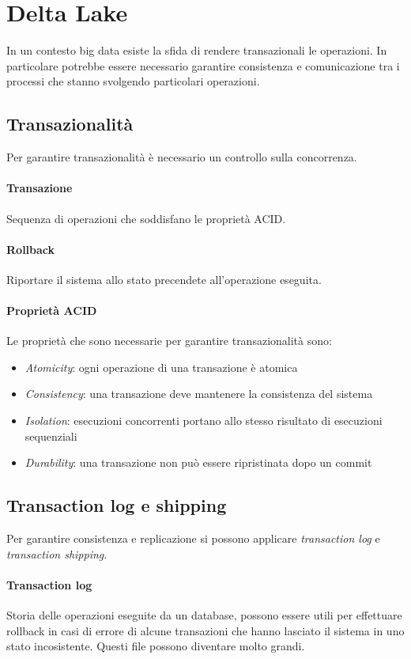 \section{Delta Lake}
In un contesto big data esiste la sfida di rendere transazionali le operazioni.
In particolare potrebbe essere necessario garantire consistenza e comunicazione tra
i processi che stanno svolgendo particolari operazioni.

\subsection{Transazionalità}
Per garantire transazionalità è necessario un controllo sulla concorrenza.

\paragraph{Transazione}
Sequenza di operazioni che soddisfano le proprietà ACID.

\paragraph{Rollback}
Riportare il sistema allo stato precendete all'operazione eseguita.

\paragraph{Proprietà ACID}
Le proprietà che sono necessarie per garantire transazionalità sono:
\begin{itemize}
    \item \emph{Atomicity}: ogni operazione di una transazione è atomica
    \item \emph{Consistency}: una transazione deve mantenere la consistenza del sistema
    \item \emph{Isolation}: esecuzioni concorrenti portano allo stesso risultato di esecuzioni sequenziali
    \item \emph{Durability}: una transazione non può essere ripristinata dopo un commit
\end{itemize}

\subsection{Transaction log e shipping}
Per garantire consistenza e replicazione si possono applicare \emph{transaction log} e
\emph{transaction shipping}.

\paragraph{Transaction log} 
Storia delle operazioni eseguite da un database, possono essere utili per effettuare
rollback in casi di errore di alcune transazioni che hanno lasciato
il sistema in uno stato incosistente. Questi file possono diventare molto grandi.

